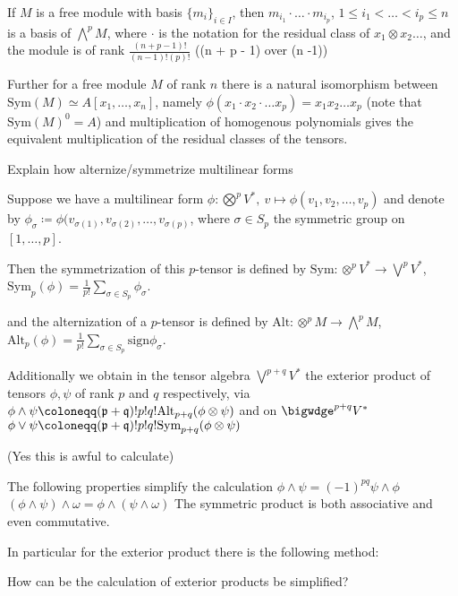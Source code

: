 If \(M\) is a free module with basis \(\{m_i\}_{i \in I}\), then
\(m_{i_1} \cdot \dots \cdot m_{i_p}\), \(1 \leq i_1 < \dots < i_p \leq n\) is a basis of \(\bigwedge^{p} M\), where \(\cdot\) is the notation for the residual class of \(x_1 \otimes x_2 \dots\), and the module is of rank \(\frac{(n + p - 1)!}{(n-1)!(p)!}\) ((n + p - 1) over (n -1))

Further for a free module \(M\) of rank \(n\) there is a natural isomorphism between \(\text{Sym}(M) \simeq A[x_1, \dots, x_n]\),
namely \(\phi(x_1 \cdot x_2 \cdot \dots x_p) = x_1 x_2 \dots x_p\) (note that \(\text{Sym}(M)^{0} = A\)) and multiplication of homogenous
polynomials gives the equivalent multiplication of the residual classes of the tensors.

Explain how alternize/symmetrize multilinear forms

Suppose we have a multilinear form \( \phi : \bigotimes^p V^\ast,\ v \mapsto \phi(v_1, v_2, \dots, v_p) \) 
and denote by \( \phi_\sigma \coloneqq \phi(v_{\sigma(1)}, v_{\sigma(2)}, \dots, v_{\sigma(p)}\), where \( \sigma \in S_p \)
the symmetric group on \( [1, \dots, p] \).

Then the symmetrization of this \( p \)-tensor is defined by \( \text{Sym} : \otimes^p V^\ast \to \bigvee^p V^\ast \),
\( \text{Sym}_p(\phi) = \frac{1}{p!}\sum_{\sigma \in S_p} \phi_\sigma\).

and the alternization of a \( p \)-tensor is defined by \( \text{Alt} : \otimes^p M \to \bigwedge^p M \),
\( \text{Alt}_p(\phi) = \frac{1}{p!}\sum_{\sigma \in S_p} \text{sign} \phi_\sigma\).

Additionally we obtain in the tensor algebra \( \bigvee^{p+q} V^\ast \)
the exterior product of tensors \( \phi, \psi \) of rank \( p \) and \( q \) respectively, via
\( \phi \wedge \psi \coloneqq \frak{(p+q)!}{p!q!}\text{Alt}_{p+q}(\phi \otimes \psi) \)
and on \( \bigwdge^{p+q} V^\ast \)
\( \phi \vee \psi \coloneqq \frak{(p+q)!}{p!q!}\text{Sym}_{p+q}(\phi \otimes \psi) \)

(Yes this is awful to calculate)

The following properties simplify the calculation 
\( \phi \wedge \psi = (-1)^{pq} \psi \wedge \phi \)
\( (\phi \wedge \psi) \wedge \omega = \phi \wedge (\psi \wedge \omega) \)
The symmetric product is both associative and even commutative.



In particular for the exterior product there is the following method:

How can be the calculation of exterior products be simplified?

